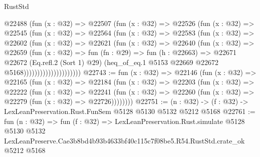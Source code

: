 \begin{lexlean}{RustStd}
\begin{coremodule}
                      @22488
                        (fun (x : @32) =>
                        @22507
                          (fun (x : @32) =>
                          @22526
                            (fun (x : @32) =>
                            @22545
                              (fun (x : @32) =>
                              @22564
                                (fun (x : @32) =>
                                @22583
                                  (fun (x : @32) =>
                                  @22602
                                    (fun (x : @32) =>
                                    @22621
                                      (fun (x : @32) =>
                                      @22640
                                        (fun (x : @32) =>
                                        @22659
                                          (fun (x : @32) =>
                                          fun (fn : @29) =>
                                          fun (h : @22663) =>
                                          @22671
                                            @22672
                                            (Eq.refl.{2} (Sort 1) @29)
                                            (heq_of_eq.{1}
                                              @5153
                                              @22669
                                              @22672
                                              @5168)))))))))))))))))))))
@22743 := fun (x : @32) =>
  @22146
    (fun (x : @32) =>
    @22165
      (fun (x : @32) =>
      @22184
        (fun (x : @32) =>
        @22203
          (fun (x : @32) =>
          @22222
            (fun (x : @32) =>
            @22241
              (fun (x : @32) => @22260 (fun (x : @32) => @22279 (fun (x : @32) => @22726))))))))
@22751 := (n : @32) -> (f : @32) -> LexLeanPreservation.Rust.FunSem @5128 @5130 @5132 @5212 @5168
@22761 := fun (n : @32) =>
  fun (f : @32) =>
  LexLeanPreservation.Rust.simulate
    @5128
    @5130
    @5132
    LexLeanPreserve.Cae3b8bd4b93b4633bf40c115c7f08be5.R54.RustStd.crate_ok
    @5212
    @5168
\end{coremodule}
\end{lexlean}
